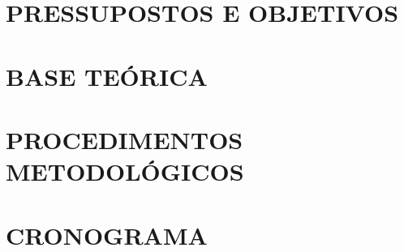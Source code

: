 \documentclass[12pt,a4paper]{article}
\begin{document}
\section{PRESSUPOSTOS E OBJETIVOS}



\newpage

\section{BASE TEÓRICA}



\newpage

\section{PROCEDIMENTOS METODOLÓGICOS}



\newpage

\section{CRONOGRAMA}



\newpage

\end{document}
